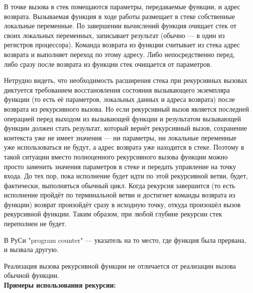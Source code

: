 \documentclass[12pt, a4paper]{article}
\begin{document}
В точке вызова в стек помещаются параметры, передаваемые функции, и адрес возврата.
Вызываемая функция в ходе работы размещает в стеке собственные локальные переменные.
По завершении вычислений функция очищает стек от своих локальных переменных, записывает результат (обычно — в один из регистров процессора). Команда возврата из функции считывает из стека адрес возврата и выполняет переход по этому адресу. Либо непосредственно перед, либо сразу после возврата из функции стек очищается от параметров.

Нетрудно видеть, что необходимость расширения стека при рекурсивных вызовах диктуется требованием восстановления состояния вызывающего экземпляра функции (то есть её параметров, локальных данных и адреса возврата) после возврата из рекурсивного вызова. Но если рекурсивный вызов является последней операцией перед выходом из вызывающей функции и результатом вызывающей функции должен стать результат, который вернёт рекурсивный вызов, сохранение контекста уже не имеет значения — ни параметры, ни локальные переменные уже использоваться не будут, а адрес возврата уже находится в стеке. Поэтому в такой ситуации вместо полноценного рекурсивного вызова функции можно просто заменить значения параметров в стеке и передать управление на точку входа. До тех пор, пока исполнение будет идти по этой рекурсивной ветви, будет, фактически, выполняться обычный цикл. Когда рекурсия завершится (то есть исполнение пройдёт по терминальной ветви и достигнет команды возврата из функции) возврат произойдёт сразу в исходную точку, откуда произошёл вызов рекурсивной функции. Таким образом, при любой глубине рекурсии стек переполнен не будет.

В РуСи "program counter"{} --- указатель на то место, где функция была прервана, и вызвала другую.

Реализация вызова рекурсивной функции не отличается от реализации вызова обычной функции.\\

\textbf{Примеры использования рекурсии: }
\end{document}
